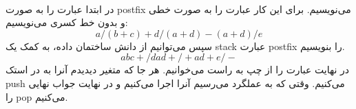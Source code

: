 \\
در ابتدا عبارت را به صورت
postfix
می‌نویسیم.
برای این کار عبارت را به صورت خطی و بدون خط کسری می‌نویسیم:
\begin{equation*}
    a / (b + c) + d / (a + d) - (a + d) / e
\end{equation*}
سپس می‌توانیم از دانش ساختمان داده، به کمک یک
stack
عبارت postfix را بنویسیم.
\begin{equation*}
    a b c + / d a d + / + a d + e / -
\end{equation*}
در نهایت عبارت را از چپ به راست می‌خوانیم. هر جا که متغیر دیدیدم آنرا به در استک
push
می‌کنیم. وقتی که به عملگرد می‌رسیم آنرا اجرا می‌کنیم و در نهایت جواب نهایی را
pop
می‌کنیم.
